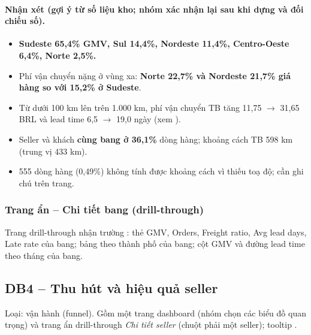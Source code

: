 

\paragraph{Nhận xét (gợi ý từ số liệu kho; \textbf{nhóm xác nhận lại sau khi dựng và đối chiếu số}).}

\begin{itemize}
  \item \textbf{Sudeste 65,4\% GMV, Sul 14,4\%, Nordeste 11,4\%, Centro-Oeste 6,4\%, Norte 2,5\%.}
  \item Phí vận chuyển nặng ở vùng xa: \textbf{Norte 22,7\% và Nordeste 21,7\% giá hàng so với 15,2\% ở Sudeste}.
  \item Từ dưới 100 km lên trên 1.000 km, phí vận chuyển TB tăng 11,75 $\rightarrow$ 31,65 BRL và lead time 6,5 $\rightarrow$ 19,0 ngày (xem ).
  \item Seller và khách \textbf{cùng bang ở 36,1\%} dòng hàng; khoảng cách TB 598 km (trung vị 433 km).
  \item 555 dòng hàng (0,49\%) không tính được khoảng cách vì thiếu toạ độ; cần ghi chú trên trang.
\end{itemize}

\subsubsection*{Trang ẩn -- Chi tiết bang (drill-through)}

Trang drill-through nhận trường : thẻ GMV, Orders, Freight ratio, Avg lead days, Late rate của bang; bảng theo thành phố của bang; cột GMV và đường lead time theo tháng của bang.


\subsection{DB4 -- Thu hút và hiệu quả seller}\label{sec:db4}
Loại: vận hành (funnel). Gồm một trang dashboard (nhóm chọn các biểu đồ quan trọng) và trang ẩn drill-through \emph{Chi tiết seller} (chuột phải một seller); tooltip .

